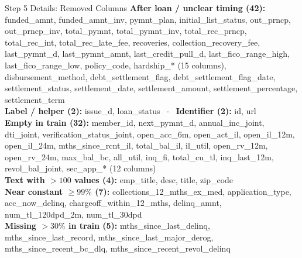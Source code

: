 \documentclass{beamer}
\begin{document}
\begin{frame}{Step 5 Details: Removed Columns}
  \tiny
  \textbf{After loan / unclear timing (42):} funded\_amnt, funded\_amnt\_inv, pymnt\_plan, initial\_list\_status, out\_prncp, out\_prncp\_inv, total\_pymnt, total\_pymnt\_inv, total\_rec\_prncp, total\_rec\_int, total\_rec\_late\_fee, recoveries, collection\_recovery\_fee, last\_pymnt\_d, last\_pymnt\_amnt, last\_credit\_pull\_d, last\_fico\_range\_high, last\_fico\_range\_low, policy\_code, hardship\_* (15 columns), disbursement\_method, debt\_settlement\_flag, debt\_settlement\_flag\_date, settlement\_status, settlement\_date, settlement\_amount, settlement\_percentage, settlement\_term\\[0.1cm]
  \textbf{Label / helper (2):} issue\_d, loan\_status \ $\cdot$ \ \textbf{Identifier (2):} id, url\\[0.1cm]
  \textbf{Empty in train (32):} member\_id, next\_pymnt\_d, annual\_inc\_joint, dti\_joint, verification\_status\_joint, open\_acc\_6m, open\_act\_il, open\_il\_12m, open\_il\_24m, mths\_since\_rcnt\_il, total\_bal\_il, il\_util, open\_rv\_12m, open\_rv\_24m, max\_bal\_bc, all\_util, inq\_fi, total\_cu\_tl, inq\_last\_12m, revol\_bal\_joint, sec\_app\_* (12 columns)\\[0.1cm]
  \textbf{Text with $>100$ values (4):} emp\_title, desc, title, zip\_code\\[0.1cm]
  \textbf{Near constant $\ge99\%$ (7):} collections\_12\_mths\_ex\_med, application\_type, acc\_now\_delinq, chargeoff\_within\_12\_mths, delinq\_amnt, num\_tl\_120dpd\_2m, num\_tl\_30dpd\\[0.1cm]
  \textbf{Missing $>30\%$ in train (5):} mths\_since\_last\_delinq, mths\_since\_last\_record, mths\_since\_last\_major\_derog, mths\_since\_recent\_bc\_dlq, mths\_since\_recent\_revol\_delinq
\end{frame}
\end{document}
